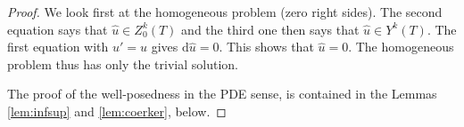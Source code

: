 \documentclass[10pt,a4paper]{amsart}
\newcommand{\rmd}{\mathrm{d}}
\begin{document}
\begin{proof}
We look first at the homogeneous problem (zero right sides). The second equation says that $\hat u \in Z^k_0(T)$ and the third one then says that $\hat u\in Y^k(T)$. The first equation with $u' = \hat u$ gives $\rmd \hat u =0$. This shows that $\hat u = 0$. The homogeneous problem thus has only the trivial solution.

The proof of the well-posedness in the PDE sense, is contained in the Lemmas \ref{lem:infsup} and \ref{lem:coerker}, below.
\end{proof}
\end{document}
